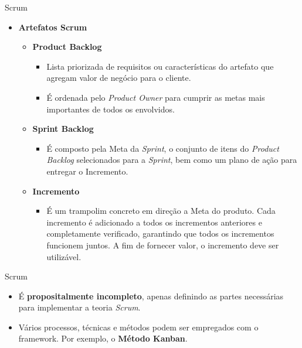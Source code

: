 \documentclass{beamer}
\begin{document}
\begin{frame}{Scrum}
	\begin{itemize}
		\item \textbf{Artefatos Scrum}
			\begin{itemize}
				\item \textbf{Product Backlog}
					\begin{itemize}
						\justifying
						\item<1> Lista priorizada de requisitos ou características do artefato que agregam valor de negócio para o cliente.
						\item<1> É ordenada pelo \textit{Product Owner} para cumprir as metas mais importantes de todos os envolvidos.
					\end{itemize}
				\item<2-> \textbf{Sprint Backlog}
					\begin{itemize}
						\justifying
						\item<2> É composto pela Meta da \textit{Sprint}, o conjunto de itens do \textit{Product Backlog} selecionados para a \textit{Sprint}, bem como um plano de ação para entregar o Incremento.
					\end{itemize}
				\item<3> \textbf{Incremento}
					\begin{itemize}
						\justifying
						\item<3> É um trampolim concreto em direção a Meta do produto. Cada incremento é adicionado a todos os incrementos anteriores e completamente verificado, garantindo que todos os incrementos funcionem juntos. A fim de fornecer valor, o incremento deve ser utilizável.
					\end{itemize}
			\end{itemize}
	\end{itemize}
\end{frame}

\begin{frame}{Scrum}
	\begin{itemize}
		\justifying
		\item É \textbf{propositalmente incompleto}, apenas definindo as partes necessárias para implementar a teoria \textit{Scrum}.
		\item Vários processos, técnicas e métodos podem ser empregados com o framework. Por exemplo, o \textbf{Método Kanban}.
	\end{itemize}
\end{frame}

\end{document}
